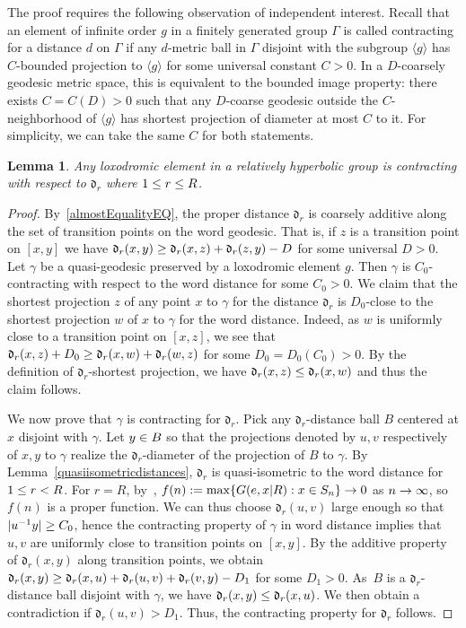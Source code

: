 \documentclass[10pt]{amsart}
\newtheorem{lemm}[theo]{Lemma}\newtheorem{prop}[theo]{Proposition}\newtheorem{coro}[theo]{Corollary}\newtheorem{conj}[theo]{Conjecture}
\theoremstyle{definition}\newtheorem{defi}[theo]{Definition}\newtheorem{rema}[theo]{Remark}\newtheorem{exam}[theo]{Example}\newtheorem{exem}[theo]{Example}\newtheorem{nota}[theo]{Notation}
\newcommand{\fkd}{\mathfrak{d}}
\let\oldin\in
\renewcommand{\in}{\mathchoice{\oldin}{\oldin}{\,\oldin\,}{\,\oldin\,}}
\let\oldge\ge
\renewcommand{\ge}{\mathchoice{\oldge}{\oldge}{\,\oldge\,}{\,\oldge\,}}
\let\oldle\le
\renewcommand{\le}{\mathchoice{\oldle}{\oldle}{\,\oldle\,}{\,\oldle\,}}
\renewcommand*{\to}{\mathchoice{\longrightarrow}{\rightarrow}{\rightarrow}{\rightarrow}}
\begin{document}
The proof requires the following observation of independent interest. Recall that an element of infinite order $g$ in a finitely generated group $\Gamma$ is called contracting for a distance $d$ on $\Gamma$ if any $d$-metric ball in $\Gamma$ disjoint with the subgroup $\langle g\rangle$ has $C$-bounded projection to $\langle g\rangle$ for some universal constant $C>0$. In a $D$-coarsely geodesic metric space, this is equivalent to the bounded image property: there exists $C=C(D)>0$ such that any $D$-coarse geodesic outside the $C$-neighborhood of $\langle g\rangle$ has shortest projection of diameter at most $C$ to it. For simplicity, we can take the same $C$ for both statements.
\begin{lemm}\label{contractingdrmetric}
Any loxodromic element in a relatively hyperbolic group is contracting with respect to $\fkd_r$ where $1\le r\le R$.
\end{lemm}
\begin{proof}
By~\eqref{almostEqualityEQ}, the proper distance $\fkd_r$ is coarsely additive along the set of transition points on the word geodesic. That is, if $z$ is a transition point on $[x,y]$ we have $\fkd_r(x,y)\ge \fkd_r(x,z)+\fkd_r(z,y)-D$ for some universal $D>0$. Let $\gamma$ be a quasi-geodesic preserved by a loxodromic element $g$. Then $\gamma$ is $C_0$-contracting with respect to the word distance for some $C_0>0$. We claim that the shortest projection $z$ of any point $x$ to $\gamma$ for the distance $\fkd_r$ is $D_0$-close to the shortest projection $w$ of $x$ to $\gamma$ for the word distance. Indeed, as $w$ is uniformly close to a transition point on $[x,z]$, we see that $\fkd_r(x,z)+D_0\ge \fkd_r(x,w)+\fkd_r(w,z)$ for some $D_0=D_0(C_0)>0$. By the definition of $\fkd_r$-shortest projection, we have $\fkd_r(x,z)\le \fkd_r(x,w)$ and thus the claim follows.

We now prove that $\gamma$ is contracting for $\fkd_r$. Pick any $\fkd_r$-distance ball $B$ centered at $x$ disjoint with $\gamma$. Let $y\in B$ so that the projections denoted by $u, v$ respectively of $x,y$ to $\gamma$ realize the $\fkd_r$-diameter of the projection of $B$ to $\gamma$. By Lemma~\ref{quasiisometricdistances}, $\fkd_r$ is quasi-isometric to the word distance for $1\le r<R$. For $r=R$, by~\cite[Lemma~2.1]{GouezelLalley}, $f(n):=\max\{G(e,x|R): x\in S_n\}\to 0$ as $n\to \infty$, so $f(n)$ is a proper function. We can thus choose $\fkd_r(u, v)$ large enough so that $|u^{-1}y|\ge C_0$, hence the contracting property of $\gamma$ in word distance implies that $u,v$ are uniformly close to transition points on $[x,y]$. By the additive property of $\fkd_r(x,y)$ along transition points, we obtain $\fkd_r(x,y)\ge \fkd_r(x,u)+\fkd_r(u,v)+\fkd_r(v,y)-D_1$ for some $D_1>0$. As~$B$ is a $\fkd_r$-distance ball disjoint with $\gamma$, we have $\fkd_r(x,y)\le \fkd_r(x,u)$. We then obtain a contradiction if $\fkd_r(u,v)>D_1$. Thus, the contracting property for $\fkd_r$ follows.
\end{proof}
\end{document}
